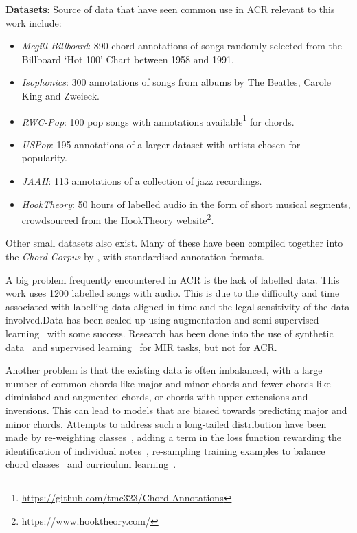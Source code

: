 
\textbf{Datasets}: Source of data that have seen common use in ACR relevant to this work include:
\begin{itemize}
    \item \emph{Mcgill Billboard}: 890 chord annotations of songs randomly selected from the Billboard `Hot 100' Chart between 1958 and 1991.~\citep{McgillBillboard}
    \item \emph{Isophonics}: 300 annotations of songs from albums by The Beatles, Carole King and Zweieck.~\citep{Isophonics}
    \item \emph{RWC-Pop}: 100 pop songs with annotations available\footnote{\url{https://github.com/tmc323/Chord-Annotations}} for chords.~\citep{RWC}
    \item \emph{USPop}: 195 annotations of a larger dataset with artists chosen for popularity.~\citep{USPop}
    \item \emph{JAAH}: 113 annotations of a collection of jazz recordings.~\citep{JAAH}
    \item \emph{HookTheory}: 50 hours of labelled audio in the form of short musical segments, crowdsourced from the HookTheory website\footnote{https://www.hooktheory.com/}.~\citep{MelodyTranscriptionViaGenerativePreTraining}
\end{itemize}

Other small datasets also exist. Many of these have been compiled together into the \emph{Chord Corpus} by \citet{Choco}, with standardised annotation formats.

A big problem frequently encountered in ACR is the lack of labelled data. This work uses 1200 labelled songs with audio. This is due to the difficulty and time associated with labelling data aligned in time and the legal sensitivity of the data involved.Data has been scaled up using augmentation and semi-supervised learning~\citep{ScalingUpSemiSupervisedLearning} with some success. Research has been done into the use of synthetic data~\citep{MusicGenTrainingData,AnnotationFreeSyntheticData} and supervised learning~\citep{MERTSupervisedLearning} for MIR tasks, but not for ACR.

Another problem is that the existing data is often imbalanced, with a large number of common chords like major and minor chords and fewer chords like diminished and augmented chords, or chords with upper extensions and inversions. This can lead to models that are biased towards predicting major and minor chords. Attempts to address such a long-tailed distribution have been made by re-weighting classes~\citep{ACRLargeVocab1}, adding a term in the loss function rewarding the identification of individual notes~\citep{StructuredTraining,ACRLargeVocab1}, re-sampling training examples to balance chord classes~\citep{BalanceRandomForestACR} and curriculum learning~\citep{CurriculumLearning}.

